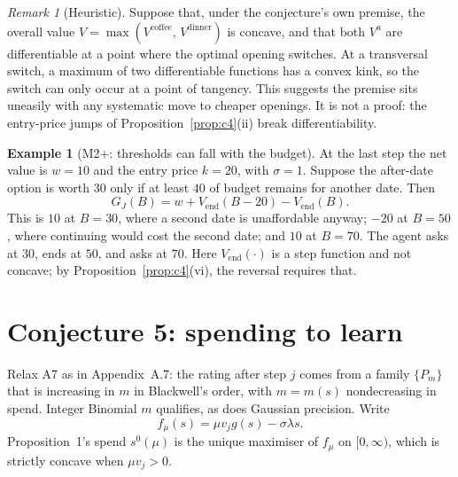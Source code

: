 \documentclass[11pt,a4paper]{article}
\theoremstyle{definition}
\newtheorem{example}[theorem]{Example}
\theoremstyle{remark}
\newtheorem{remark}[theorem]{Remark}
\newcommand{\Vend}{V_{\mathrm{end}}}
\begin{document}
\begin{remark}[Heuristic]
Suppose that, under the conjecture's own premise, the overall value $V=\max(V^{\mathrm{coffee}},\,V^{\mathrm{dinner}})$ is concave, and that both $V^a$ are differentiable at a point where the optimal opening switches. At a transversal switch, a maximum of two differentiable functions has a convex kink, so the switch can only occur at a point of tangency. This suggests the premise sits uneasily with any systematic move to cheaper openings. It is not a proof: the entry-price jumps of Proposition~\ref{prop:c4}(ii) break differentiability.
\end{remark}

\begin{example}[M2+: thresholds can fall with the budget]\label{ex:m2plus}
At the last step the net value is $w=10$ and the entry price $k=20$, with $\sigma=1$. Suppose the after-date option is worth $30$ only if at least $40$ of budget remains for another date. Then
\[
G_J(B)=w+\Vend(B-20)-\Vend(B).
\]
This is $10$ at $B=30$, where a second date is unaffordable anyway; $-20$ at $B=50$, where continuing would cost the second date; and $10$ at $B=70$. The agent asks at $30$, ends at $50$, and asks at $70$. Here $\Vend(\cdot)$ is a step function and not concave; by Proposition~\ref{prop:c4}(vi), the reversal requires that.
\end{example}

\section{Conjecture 5: spending to learn}\label{sec:c5}

Relax A7 as in Appendix~A.7: the rating after step $j$ comes from a family $\{P_m\}$ that is increasing in $m$ in Blackwell's order, with $m=m(s)$ nondecreasing in spend. Integer Binomial $m$ qualifies, as does Gaussian precision. Write
\[
f_\mu(s)=\mu v_jg(s)-\sigma\lambda s .
\]
Proposition~1's spend $s^0(\mu)$ is the unique maximiser of $f_\mu$ on $[0,\infty)$, which is strictly concave when $\mu v_j>0$.
\end{document}
